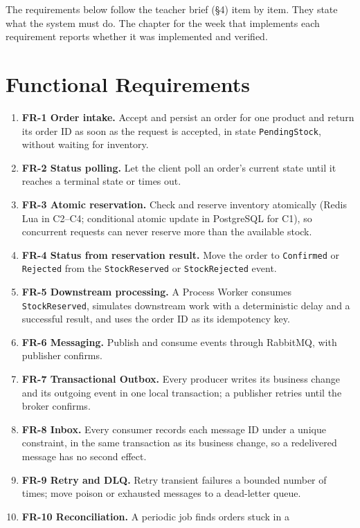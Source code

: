 \documentclass[a4paper]{report}
\begin{document}
The requirements below follow the teacher brief (§4) item by item.
They state what the system must do. The chapter for the week that implements
each requirement reports whether it was implemented and verified.

\section{Functional Requirements}
\begin{enumerate}
  \item \textbf{FR-1 Order intake.} Accept and persist an order for one product
    and return its order ID as soon as the request is accepted, in state
    \texttt{PendingStock}, without waiting for inventory.
  \item \textbf{FR-2 Status polling.} Let the client poll an order's current
    state until it reaches a terminal state or times out.
  \item \textbf{FR-3 Atomic reservation.} Check and reserve inventory atomically
    (Redis Lua in C2--C4; conditional atomic update in PostgreSQL for C1), so
    concurrent requests can never reserve more than the available stock.
  \item \textbf{FR-4 Status from reservation result.} Move the order to
    \texttt{Confirmed} or \texttt{Rejected} from the \texttt{StockReserved} or
    \texttt{StockRejected} event.
  \item \textbf{FR-5 Downstream processing.} A Process Worker consumes
    \texttt{StockReserved}, simulates downstream work with a deterministic
    delay and a successful result, and uses the order ID as its idempotency key.
  \item \textbf{FR-6 Messaging.} Publish and consume events through RabbitMQ,
    with publisher confirms.
  \item \textbf{FR-7 Transactional Outbox.} Every producer writes its business
    change and its outgoing event in one local transaction; a publisher retries
    until the broker confirms.
  \item \textbf{FR-8 Inbox.} Every consumer records each message ID under a
    unique constraint, in the same transaction as its business change, so a
    redelivered message has no second effect.
  \item \textbf{FR-9 Retry and DLQ.} Retry transient failures a bounded number
    of times; move poison or exhausted messages to a dead-letter queue.
  \item \textbf{FR-10 Reconciliation.} A periodic job finds orders stuck in a

\end{enumerate}
\end{document}
